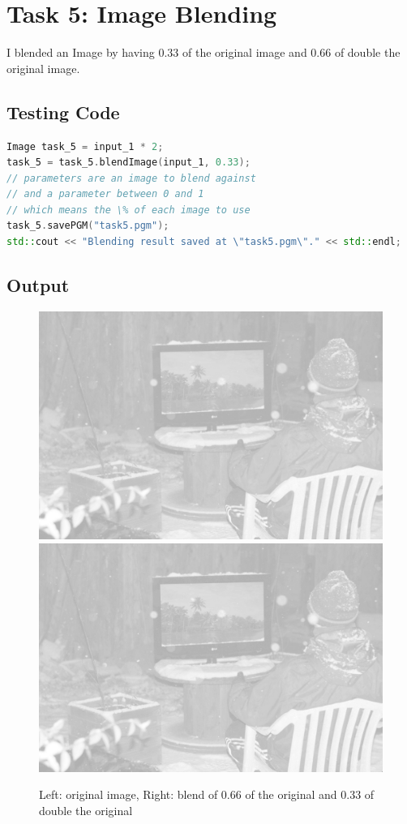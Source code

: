\documentclass[pdftex,a4paper,10pt,titlepage]{article}
\begin{document}
\pagebreak

\section{Task 5: Image Blending}
I blended an Image by having 0.33 of the original image and 0.66 of double the original image.
\subsection{Testing Code}
\begin{lstlisting}[language=C++]
Image task_5 = input_1 * 2;
task_5 = task_5.blendImage(input_1, 0.33);
// parameters are an image to blend against
// and a parameter between 0 and 1
// which means the \% of each image to use
task_5.savePGM("task5.pgm");
std::cout << "Blending result saved at \"task5.pgm\"." << std::endl;
\end{lstlisting}

\subsection{Output}
\begin{figure}[h]
\includegraphics[scale=0.225]{snow.png}
\includegraphics[scale=0.225]{task5.png} 
\caption {Left: original image, Right: blend of 0.66 of the original and 0.33 of double the original}
\label{fig:copied_image}
\end{figure}
\end{document}
